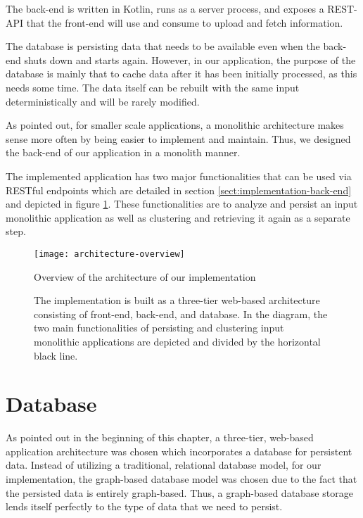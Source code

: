 \documentclass[12pt,a4paper]{report}
\begin{document}
The back-end is written in Kotlin, runs as a server process, and exposes
a REST-API that the front-end will use and consume to upload and fetch information.

The database is persisting data that needs to be available even when the
back-end shuts down and starts again. However, in our application,
the purpose of the database is mainly that to cache data after it has
been initially processed, as this needs some time. The data itself can be
rebuilt with the same input deterministically and will be rarely modified.

As pointed out, for smaller scale applications, a monolithic architecture
makes sense more often by being easier to implement and maintain.
Thus, we designed the back-end of our application in a monolith manner.

The implemented application has two major functionalities that can be used
via RESTful endpoints which are detailed in section \ref{sect:implementation-back-end}
and depicted in figure \ref{fig:architecture-overview}.
These functionalities are to analyze and persist an input monolithic application
as well as clustering and retrieving it again as a separate step.

\begin{figure}[htbp]
\centering
\texttt{[image: architecture-overview]}
\caption{Overview of the architecture of our implementation}
\caption*{
    The implementation is built as a three-tier web-based architecture consisting of
    front-end, back-end, and database. In the diagram, the two main functionalities of
    persisting and clustering input monolithic applications are depicted and
    divided by the horizontal black line.
}
\label{fig:architecture-overview}
\end{figure}



\section{Database} \label{sect:implementation-database}

As pointed out in the beginning of this chapter, a three-tier, web-based
application architecture was chosen which incorporates a database
for persistent data.
Instead of utilizing a traditional, relational database model,
for our implementation, the graph-based database model was chosen
due to the fact that the persisted data is entirely graph-based.
Thus, a graph-based database storage lends itself perfectly to the
type of data that we need to persist.
\end{document}
